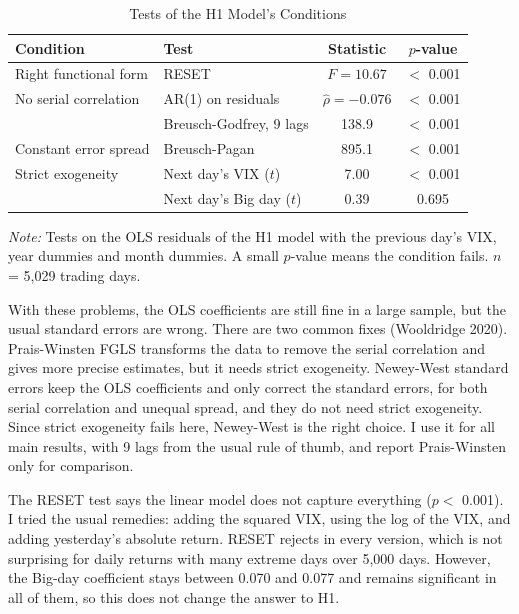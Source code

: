 \documentclass[preprint,letterpaper,11pt,authoryear]{elsarticle}
\newenvironment{tablenotes}{\par\vspace{3pt}\begin{minipage}{0.95\linewidth}\footnotesize\textit{Note:} }{\end{minipage}}
\begin{document}
\begin{table}[!htbp]
\centering\small\setlength{\tabcolsep}{4pt}
\caption{Tests of the H1 Model's Conditions}
\begin{tabular}{llcc}
\toprule
Condition & Test & Statistic & $p$-value \\
\midrule
Right functional form & RESET & $F = 10.67$ & $<$ 0.001 \\
No serial correlation & AR(1) on residuals & $\hat\rho = -0.076$ & $<$ 0.001 \\
 & Breusch-Godfrey, 9 lags & 138.9 & $<$ 0.001 \\
Constant error spread & Breusch-Pagan & 895.1 & $<$ 0.001 \\
Strict exogeneity & Next day's VIX ($t$) & 7.00 & $<$ 0.001 \\
 & Next day's Big day ($t$) & 0.39 & 0.695 \\
\bottomrule
\end{tabular}
\begin{tablenotes}
Tests on the OLS residuals of the H1 model with the previous day's VIX, year dummies and month dummies. A small $p$-value means the condition fails. $n$ = 5,029 trading days.
\end{tablenotes}
\end{table}

With these problems, the OLS coefficients are still fine in a large sample, but the usual standard errors are wrong. There are two common fixes (Wooldridge 2020). Prais-Winsten FGLS transforms the data to remove the serial correlation and gives more precise estimates, but it needs strict exogeneity. Newey-West standard errors keep the OLS coefficients and only correct the standard errors, for both serial correlation and unequal spread, and they do not need strict exogeneity. Since strict exogeneity fails here, Newey-West is the right choice. I use it for all main results, with 9 lags from the usual rule of thumb, and report Prais-Winsten only for comparison.

The RESET test says the linear model does not capture everything ($p <$ 0.001). I tried the usual remedies: adding the squared VIX, using the log of the VIX, and adding yesterday's absolute return. RESET rejects in every version, which is not surprising for daily returns with many extreme days over 5,000 days. However, the Big-day coefficient stays between 0.070 and 0.077 and remains significant in all of them, so this does not change the answer to H1.
\end{document}
